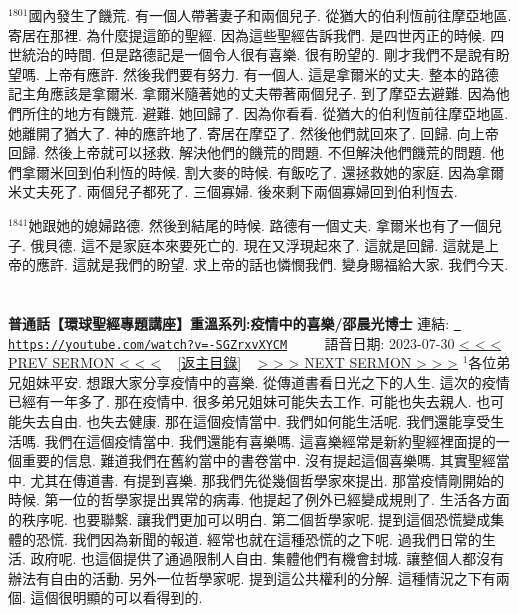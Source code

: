 \documentclass{book}
\begin{document}
$^{1801}$國內發生了饑荒.
有一個人帶著妻子和兩個兒子.
從猶大的伯利恆前往摩亞地區.
寄居在那裡.
為什麼提這節的聖經.
因為這些聖經告訴我們.
是四世丙正的時候.
四世統治的時間.
但是路德記是一個令人很有喜樂.
很有盼望的.
剛才我們不是說有盼望嗎.
上帝有應許.
然後我們要有努力.
有一個人.
這是拿爾米的丈夫.
整本的路德記主角應該是拿爾米.
拿爾米隨著她的丈夫帶著兩個兒子.
到了摩亞去避難.
因為他們所住的地方有饑荒.
避難.
她回歸了.
因為你看看.
從猶大的伯利恆前往摩亞地區.
她離開了猶大了.
神的應許地了.
寄居在摩亞了.
然後他們就回來了.
回歸.
向上帝回歸.
然後上帝就可以拯救.
解決他們的饑荒的問題.
不但解決他們饑荒的問題.
他們拿爾米回到伯利恆的時候.
割大麥的時候.
有飯吃了.
還拯救她的家庭.
因為拿爾米丈夫死了.
兩個兒子都死了.
三個寡婦.
後來剩下兩個寡婦回到伯利恆去.

$^{1841}$她跟她的媳婦路德.
然後到結尾的時候.
路德有一個丈夫.
拿爾米也有了一個兒子.
俄貝德.
這不是家庭本來要死亡的.
現在又浮現起來了.
這就是回歸.
這就是上帝的應許.
這就是我們的盼望.
求上帝的話也憐憫我們.
變身賜福給大家.
我們今天.
\newpage



\section{}
\label{sec:_SGZrxvXYCM}
\textbf{普通話【環球聖經專題講座】重溫系列:疫情中的喜樂/邵晨光博士}
\newline
\newline
連結: \href{https://youtube.com/watch?v=-SGZrxvXYCM}{\texttt{ https://youtube.com/watch?v=-SGZrxvXYCM}} ~~~~ 語音日期: 2023-07-30 
\newline
\newline
\hyperref[sec:E3VkyNG0obA]{\small{< < < PREV SERMON < < <}}
~
\hyperref[sec:index]{\small{[返主目錄]}}
~
\hyperref[sec:tf36g33yLwo]{\small{> > > NEXT SERMON > > >}}
\newline
\newline
$^{1}$各位弟兄姐妹平安.
想跟大家分享疫情中的喜樂.
從傳道書看日光之下的人生.
這次的疫情已經有一年多了.
那在疫情中.
很多弟兄姐妹可能失去工作.
可能也失去親人.
也可能失去自由.
也失去健康.
那在這個疫情當中.
我們如何能生活呢.
我們還能享受生活嗎.
我們在這個疫情當中.
我們還能有喜樂嗎.
這喜樂經常是新約聖經裡面提的一個重要的信息.
難道我們在舊約當中的書卷當中.
沒有提起這個喜樂嗎.
其實聖經當中.
尤其在傳道書.
有提到喜樂.
那我們先從幾個哲學家來提出.
那當疫情剛開始的時候.
第一位的哲學家提出異常的病毒.
他提起了例外已經變成規則了.
生活各方面的秩序呢.
也要聯繫.
讓我們更加可以明白.
第二個哲學家呢.
提到這個恐慌變成集體的恐慌.
我們因為新聞的報道.
經常也就在這種恐慌的之下呢.
過我們日常的生活.
政府呢.
也這個提供了通過限制人自由.
集體他們有機會封城.
讓整個人都沒有辦法有自由的活動.
另外一位哲學家呢.
提到這公共權利的分解.
這種情況之下有兩個.
這個很明顯的可以看得到的.
\end{document}
